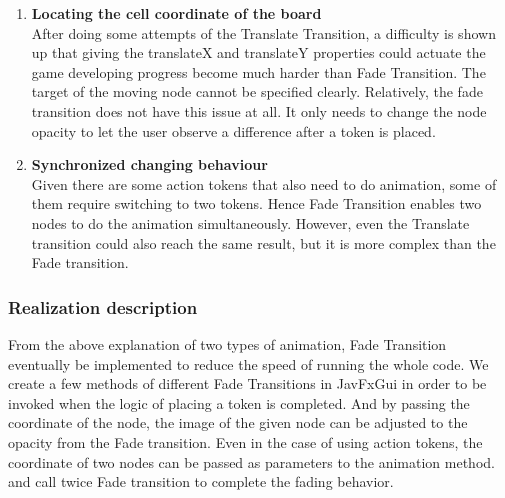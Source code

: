 \begin{enumerate}
	\item\textbf{Locating the cell coordinate of the board}\\
    After doing some attempts of the Translate Transition, a difficulty is shown up that giving the translateX and translateY properties could actuate the game developing progress become much harder than Fade Transition. The target of the moving node cannot be specified clearly. Relatively, the fade transition does not have this issue at all. It only needs to change the node opacity to let the user observe a difference after a token is placed.  
	
	\item\textbf{Synchronized changing behaviour}\\
	Given there are some action tokens that also need to do animation, some of them require switching to two tokens. Hence Fade Transition enables two nodes to do the animation simultaneously. However, even the Translate transition could also reach the same result, but it is more complex than the Fade transition.  

\end{enumerate}


\subsubsection{Realization description}

From the above explanation of two types of animation, Fade Transition eventually be implemented to reduce the speed of running the whole code. We create a few methods of different Fade Transitions in JavFxGui in order to be invoked when the logic of placing a token is completed. And by passing the coordinate of the node, the image of the given node can be adjusted to the opacity from the Fade transition. Even in the case of using action tokens, the coordinate of two nodes can be passed as parameters to the animation method. and call twice Fade transition to complete the fading behavior. 



